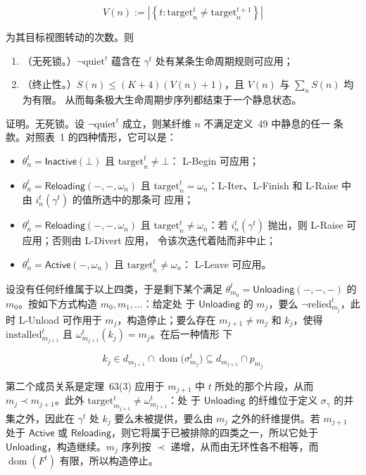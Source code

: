 \documentclass[
  10
]{article}
\begin{document}
\[
V(n) := \left| \left\{ t : \mathrm{target}_{n}^{t} \neq \mathrm{target}_{n}^{t+1} \right\} \right| \tag{61}
\]

为其目标视图转动的次数。则

\begin{enumerate}
\def\labelenumi{\arabic{enumi}.}
\item
  （无死锁。）\(\neg \mathrm{quiet}^{t}\) 蕴含在 \(\gamma^{t}\) 处有某条生命周期规则可应用；
\item
  （终止性。）\(S(n) \leq (K+4)(V(n)+1)\)，且 \(V(n)\) 与 \(\sum_{n} S(n)\) 均为有限。
  从而每条极大生命周期步序列都结束于一个静息状态。
\end{enumerate}

证明。无死锁。设 \(\neg \mathrm{quiet}^{t}\) 成立，则某纤维 \(n\) 不满足定义~49 中静息的任一
条款。对照表~1 的四种情形，它可以是：

\begin{itemize}
\item
  \(\theta_{n}^{t} = \mathsf{Inactive}(\bot)\) 且 \(\mathrm{target}_{n}^{t} \neq \bot\)：
  L-Begin 可应用；
\item
  \(\theta_{n}^{t} = \mathsf{Reloading}(-,-,\omega_{n})\) 且 \(\mathrm{target}_{n}^{t} =
  \omega_{n}\)：L-Iter、L-Finish 和 L-Raise 中由 \(i_{n}^{t}(\gamma^{t})\) 的值所选中的那条可
  应用；
\item
  \(\theta_{n}^{t} = \mathsf{Reloading}(-,-,\omega_{n})\) 且 \(\mathrm{target}_{n}^{t} \neq
  \omega_{n}\)：若 \(i_{n}^{t}(\gamma^{t})\) 抛出，则 L-Raise 可应用；否则由 L-Divert 应用，
  令该次迭代着陆而非中止；
\item
  \(\theta_{n}^{t} = \mathsf{Active}(-,\omega_{n})\) 且 \(\mathrm{target}_{n}^{t} \neq \omega_{n}\)：
  L-Leave 可应用。
\end{itemize}

设没有任何纤维属于以上四类，于是剩下某个满足 \(\theta_{m_{0}}^{t} =
\mathsf{Unloading}(-,-,-)\) 的 \(m_{0}\)。按如下方式构造 \(m_{0}, m_{1}, \ldots\)：给定处
于 \(\mathsf{Unloading}\) 的 \(m_{j}\)，要么 \(\neg \mathrm{relied}_{m_{j}}^{t}\)，此时 L-Unload
可作用于 \(m_{j}\)，构造停止；要么存在 \(m_{j+1} \neq m_{j}\) 和 \(k_{j}\)，使得
\(\mathrm{installed}_{m_{j+1}}^{t}\) 且 \(\omega_{m_{j+1}}^{t}(k_{j}) = m_{j}\)。在后一种情形
下

\[
k_{j} \in d_{m_{j+1}} \cap \operatorname{dom}\Big(\sigma_{m_{j}}^{t}\Big) \subseteq d_{m_{j+1}} \cap p_{m_{j}}
\]

第二个成员关系是定理~63(3) 应用于 \(m_{j+1}\) 中 \(t\) 所处的那个片段，从而
\(m_{j} \prec m_{j+1}\)。此外 \(\mathrm{target}_{m_{j+1}}^{t} \neq \omega_{m_{j+1}}^{t}\)：处
于 \(\mathsf{Unloading}\) 的纤维位于定义 \(\sigma_{\gamma}\) 的并集之外，因此在 \(\gamma^{t}\)
处 \(k_{j}\) 要么未被提供，要么由 \(m_{j}\) 之外的纤维提供。若 \(m_{j+1}\) 处于
\(\mathsf{Active}\) 或 \(\mathsf{Reloading}\)，则它将属于已被排除的四类之一，所以它处于
\(\mathsf{Unloading}\)，构造继续。\(m_{j}\) 序列按 \(\prec\) 递增，从而由无环性各不相等，而
\(\operatorname{dom}(F^{t})\) 有限，所以构造停止。
\end{document}
